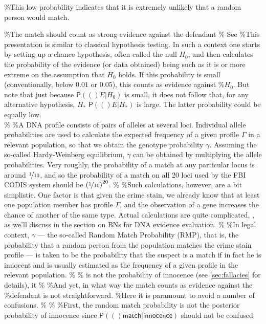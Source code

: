 \documentclass[10pt,dvipsnames,enabledeprecatedfontcommands]{scrartcl}
\newcommand{\pr}[1]{\mathsf{P}(#1)}
\begin{document}
\%This low probability indicates that it is extremely unlikely that a
random person would match.

\%The match should count as strong evidence against the defendant \% See
\%This presentation is similar to classical hypothesis testing. In such
a context one starts by setting up a chance hypothesis, often called the
null \(H_0\), and then calculates the probability of the evidence (or
data obtained) being such as it is or more extreme on the assumption
that \(H_0\) holds. If this probability is small (conventionally, below
\(0.01\) or \(0.05\)), this counts as evidence against \%\(H_0\). But
note that just because \(\pr(E\vert H_0)\) is small, it does not follow
that, for any alternative hypothesis, \(H_*\) \(\pr(E\vert H_*)\) is
large. The latter probability could be equally low.\\
\% \%A DNA profile consists of pairs of alleles at several loci.
Individual allele probabilities are used to calculate the expected
frequency of a given profile \(\Gamma\) in a relevant population, so
that we obtain the genotype probability \(\gamma\). Assuming the
so-called Hardy-Weinberg equilibrium, \(\gamma\) can be obtained by
multiplying the allele probabilities. Very roughly, the probability of a
match at any particular locus is around \(\nicefrac{1}{10}\), and so the
probability of a match on all 20 loci used by the FBI CODIS system
should be \(\left(\nicefrac{1}{10}\right)^{20}\). \% \%Such
calculations, however, are a bit simplistic. One factor is that given
the crime stain, we already know that at least one population member has
profile \(\Gamma\), and the observation of a gene increases the chance
of another of the same type. Actual calculations are quite complicated,
\citep[see][]{taroni2006bayesian}, as we'll discuss in the section on
BNs for DNA evidence evaluation. \% \%In legal context, \(\gamma\) ---
the so-called Random Match Probability (RMP), that is, the probability
that a random person from the population matches the crime stain profile
--- is taken to be the probability that the suspect is a match if in
fact he is innocent and is usually estimated as the frequency of a given
profile in the relevant population. \% \% is not the probability of
innocence (see \ref{sec:fallacies} for details), it \% \%And yet, in
what way the match counts as evidence against the \%defendant is not
straightforward. \%Here it is paramount to avoid a number of confusions.
\% \% \%First, the random match probability is not the posterior
probability of innocence since
\(\pr(\textsf{match} \vert \textsf{innocence})\) should not be confused
\end{document}
